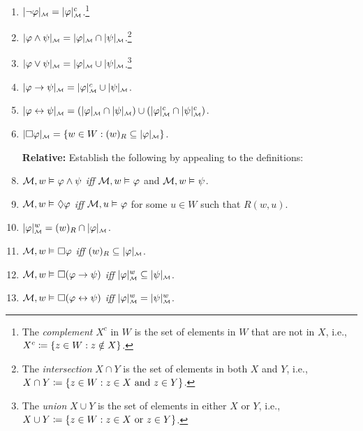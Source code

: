 \documentclass[a4paper, 11pt]{article} %
\begin{document}
\begin{enumerate}[leftmargin=1.2in,itemsep=1pt]
    \item $\interpret{\M}{\neg \metaA} = \interpret{\M}{\metaA}^c$.\footnote{The \textit{complement} $X^c$ in $W$ is the set of elements in $W$ that are not in $X$, i.e., $X^c \coloneq \set{z \in W : z \notin X}$.}
    \item $\interpret{\M}{\metaA \wedge \metaB} = \interpret{\M}{\metaA} \cap \interpret{\M}{\metaB}$.\footnote{The \textit{intersection} $X\cap Y$ is the set of elements in both $X$ and $Y$, i.e., $X \cap Y \coloneq \set{z \in W : z \in X ~\text{and}~ z \in Y}$.}
    \item $\interpret{\M}{\metaA \vee \metaB} = \interpret{\M}{\metaA} \cup \interpret{\M}{\metaB}$.\footnote{The \textit{union} $X \cup Y$ is the set of elements in either $X$ or $Y$, i.e., $X \cup Y \coloneq \set{z \in W : z \in X ~\text{or}~ z \in Y}$.}
    \item $\interpret{\M}{\metaA \rightarrow \metaB} = \interpret{\M}{\metaA}^c \cup \interpret{\M}{\metaB}$.
    \item $\interpret{\M}{\metaA \leftrightarrow \metaB} = (\interpret{\M}{\metaA} \cap \interpret{\M}{\metaB}) \cup (\interpret{\M}{\metaA}^c \cap \interpret{\M}{\metaB}^c)$.
    \item $\interpret{\M}{\Box \metaA} = \set{w \in W : (w)_R \subseteq \interpret{\M}{\metaA}}$.
	\item[\bf Relative:] Establish the following by appealing to the definitions:
    \item $\M, w \MLmodels[] \metaA \wedge \metaB$ \textit{iff} $\M, w \MLmodels \metaA$ and $\M, w \MLmodels \metaB$.
    \item $\M, w \MLmodels[] \Diamond\metaA$ \textit{iff} $\M, u \MLmodels \metaA$ for some $u \in W$ such that $R(w, u)$.
    \item $\interpret{\M}{\metaA}^w = (w)_R \cap \interpret{\M}{\metaA}$.
    \item $\M, w \MLmodels[] \Box\metaA$ \textit{iff} $(w)_R \subseteq \interpret{\M}{\metaA}$.
    \item $\M, w \MLmodels[] \Box(\metaA \rightarrow \metaB)$ \textit{iff} $\interpret{\M}{\metaA}^w \subseteq \interpret{\M}{\metaB}$.
    \item $\M, w \MLmodels[] \Box(\metaA \leftrightarrow \metaB)$ \textit{iff} $\interpret{\M}{\metaA}^w = \interpret{\M}{\metaB}^w$.

\end{enumerate}
\end{document}
